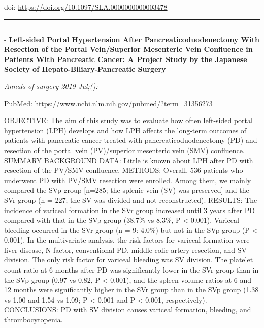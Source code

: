 \documentclass[]{article}
\begin{document}
doi: \url{https://doi.org/10.1097/SLA.0000000000003478}

{}

{}

\begin{center}\rule{0.5\linewidth}{\linethickness}\end{center}

\begin{center}\rule{0.5\linewidth}{\linethickness}\end{center}

 - \textbf{Left-sided Portal Hypertension After Pancreaticoduodenectomy
With Resection of the Portal Vein/Superior Mesenteric Vein Confluence in
Patients With Pancreatic Cancer: A Project Study by the Japanese Society
of Hepato-Biliary-Pancreatic Surgery}

\emph{Annals of surgery 2019 Jul;():}

PubMed: \url{https://www.ncbi.nlm.nih.gov/pubmed/?term=31356273}

OBJECTIVE: The aim of this study was to evaluate how often left-sided
portal hypertension (LPH) develops and how LPH affects the long-term
outcomes of patients with pancreatic cancer treated with
pancreaticoduodenectomy (PD) and resection of the portal vein
(PV)/superior mesenteric vein (SMV) confluence. SUMMARY BACKGROUND DATA:
Little is known about LPH after PD with resection of the PV/SMV
confluence. METHODS: Overall, 536 patients who underwent PD with PV/SMV
resection were enrolled. Among them, we mainly compared the SVp group
{[}n=285; the splenic vein (SV) was preserved{]} and the SVr group (n =
227; the SV was divided and not reconstructed). RESULTS: The incidence
of variceal formation in the SVr group increased until 3 years after PD
compared with that in the SVp group (38.7\% vs 8.3\%, P \textless{}
0.001). Variceal bleeding occurred in the SVr group (n = 9: 4.0\%) but
not in the SVp group (P \textless{} 0.001). In the multivariate
analysis, the risk factors for variceal formation were liver disease, N
factor, conventional PD, middle colic artery resection, and SV division.
The only risk factor for variceal bleeding was SV division. The platelet
count ratio at 6 months after PD was significantly lower in the SVr
group than in the SVp group (0.97 vs 0.82, P \textless{} 0.001), and the
spleen-volume ratios at 6 and 12 months were significantly higher in the
SVr group than in the SVp group (1.38 vs 1.00 and 1.54 vs 1.09; P
\textless{} 0.001 and P \textless{} 0.001, respectively). CONCLUSIONS:
PD with SV division causes variceal formation, bleeding, and
thrombocytopenia.
\end{document}
